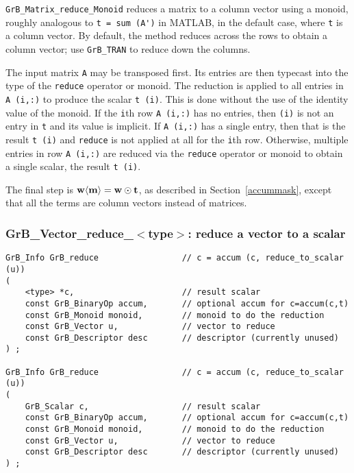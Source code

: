 \documentclass[12pt]{article}
\begin{document}
\verb'GrB_Matrix_reduce_Monoid'
reduces a matrix to a column vector using a monoid, roughly analogous
to \verb"t = sum (A')" in MATLAB, in the default case, where \verb't' is a
column vector.  By default, the method reduces across the rows to
obtain a column vector; use \verb'GrB_TRAN' to reduce down the columns.

The input matrix \verb'A' may be transposed first.  Its entries are then
typecast into the type of the \verb'reduce' operator or monoid.  The reduction
is applied to all entries in \verb'A (i,:)' to produce the scalar \verb't (i)'.
This is done without the use of the identity value of the monoid.  If the
\verb'i'th row \verb'A (i,:)' has no entries, then \verb'(i)' is not an entry
in \verb't' and its value is implicit.  If \verb'A (i,:)' has a single entry,
then that is the result \verb't (i)' and \verb'reduce' is not applied at all
for the \verb'i'th row.  Otherwise, multiple entries in row \verb'A (i,:)' are
reduced via the \verb'reduce' operator or monoid to obtain a single scalar,
the result \verb't (i)'.

The final step is ${\bf w \langle m \rangle  = w \odot t}$, as described
in Section~\ref{accummask}, except that all the
terms are column vectors instead of matrices.

\newpage
\subsubsection{{\sf GrB\_Vector\_reduce\_$<$type$>$:} reduce a vector to a scalar}
\label{reduce_vector_to_scalar}

\begin{mdframed}[userdefinedwidth=6in]
{\footnotesize
\begin{verbatim}
GrB_Info GrB_reduce                 // c = accum (c, reduce_to_scalar (u))
(
    <type> *c,                      // result scalar
    const GrB_BinaryOp accum,       // optional accum for c=accum(c,t)
    const GrB_Monoid monoid,        // monoid to do the reduction
    const GrB_Vector u,             // vector to reduce
    const GrB_Descriptor desc       // descriptor (currently unused)
) ;

GrB_Info GrB_reduce                 // c = accum (c, reduce_to_scalar (u))
(
    GrB_Scalar c,                   // result scalar
    const GrB_BinaryOp accum,       // optional accum for c=accum(c,t)
    const GrB_Monoid monoid,        // monoid to do the reduction
    const GrB_Vector u,             // vector to reduce
    const GrB_Descriptor desc       // descriptor (currently unused)
) ;
\end{verbatim} } \end{mdframed}
\end{document}
